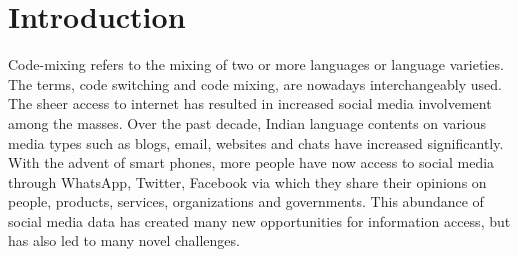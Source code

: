 \documentclass[11pt,a4paper]{article}
\begin{document}
\section{Introduction}
Code-mixing refers to the mixing of two or more languages or language varieties. The terms, code switching and code mixing, are nowadays interchangeably used. The sheer access to internet has resulted in increased social media involvement among the masses. Over the past decade, Indian language contents on various media types such as blogs, email, websites and chats have increased significantly. With the advent of smart phones, more people have now access to social media through WhatsApp, Twitter, Facebook via which they share their opinions on people, products, services, organizations and governments. This abundance of social media data has created many new opportunities for information access, but has also led to many novel challenges.
\end{document}
